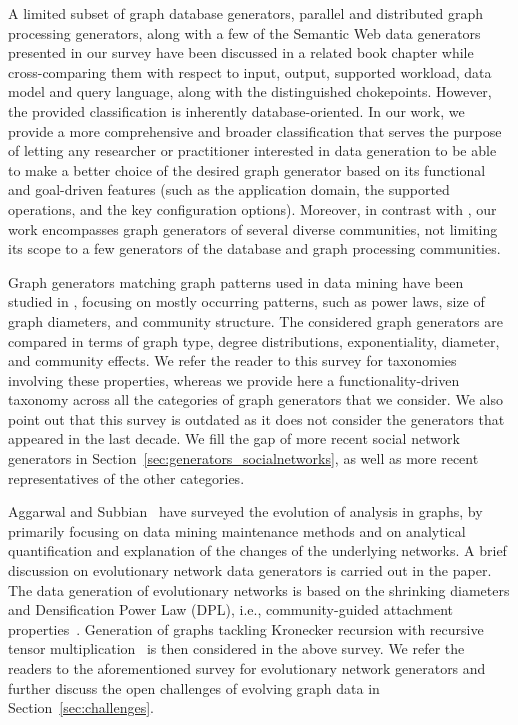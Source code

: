 A limited subset of graph database
generators, parallel and distributed graph processing generators, along
with a few of the Semantic Web data generators presented in our survey have
been discussed in a related book chapter
\cite{BFHI18} while cross-comparing them with respect to input, output,
supported workload, data model and query language, along with the
distinguished chokepoints. However, the provided classification is
inherently database-oriented.
In our work, we provide a more comprehensive and broader classification
 that serves the purpose of letting any
researcher or practitioner interested in data generation  to be able to make a better
choice of the desired graph
generator based on its functional and goal-driven features (such as the application domain,
the supported operations, and the key configuration options).
Moreover, in contrast with \cite{BFHI18}, our work encompasses graph generators of several
diverse communities, not limiting its scope to a few generators of the database
and graph processing communities.

Graph generators matching graph patterns used in data mining have been
studied in \cite{Chakrabarti:2006:GML:1132952.1132954},
focusing on mostly occurring patterns, such as power laws, size of graph diameters,
and community structure. The considered graph generators are compared in
terms of graph type, degree distributions, exponentiality, diameter, and
community effects. We refer the reader to this survey for taxonomies
involving these properties, whereas we provide here a functionality-driven
taxonomy across all the categories of graph generators that we consider.
We also point out that this survey is outdated as it does not consider the
generators that appeared in the last decade.
We fill the gap of more recent social network generators
in Section~\ref{sec:generators_socialnetworks}, as well as more recent representatives of the other categories.


Aggarwal and Subbian~\cite{AggarwalS14} have surveyed the evolution of analysis in
graphs, by primarily focusing on data mining maintenance methods and on analytical
quantification and explanation of the changes of the underlying networks.
A brief discussion on evolutionary
network data generators is carried out in
the paper. The data generation of evolutionary networks is based on the
shrinking diameters and Densification Power Law (DPL), i.e., community-guided
attachment properties~\cite{Leskovec:2005:GOT:1081870.1081893}.
Generation of graphs tackling Kronecker
recursion with recursive tensor multiplication~\cite{AkogluMF08} is then considered in the above survey.
We refer the readers to the aforementioned survey for evolutionary network generators and further
discuss the open challenges of evolving graph data in Section~\ref{sec:challenges}.

